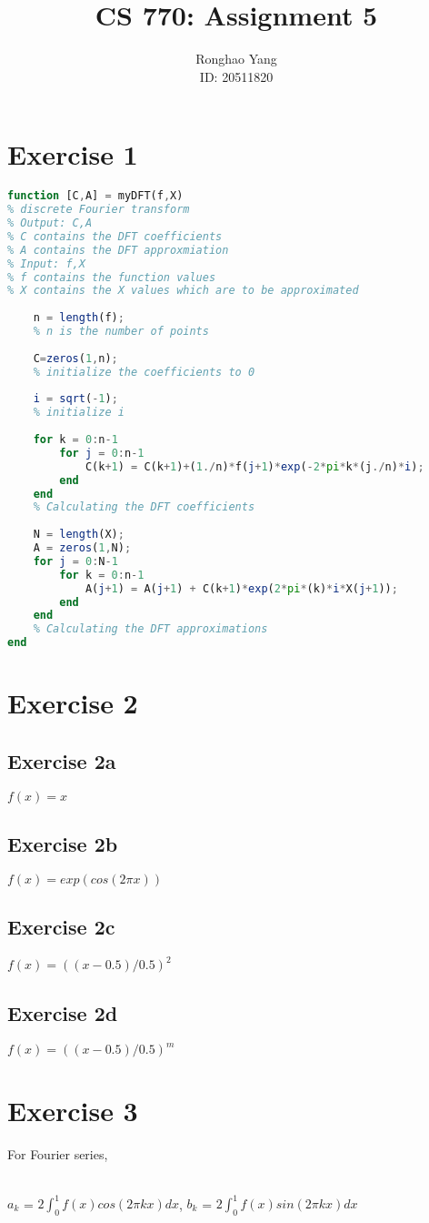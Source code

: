 \documentclass[11pt]{article} %
\title{CS 770: Assignment 5}
\author{Ronghao Yang\\ID: 20511820}
\begin{document}
\maketitle

\section{Exercise 1}
\begin{lstlisting}[language=Octave]
function [C,A] = myDFT(f,X)
% discrete Fourier transform
% Output: C,A
% C contains the DFT coefficients
% A contains the DFT approxmiation
% Input: f,X
% f contains the function values
% X contains the X values which are to be approximated
    
    n = length(f);
    % n is the number of points
    
    C=zeros(1,n);
    % initialize the coefficients to 0
    
    i = sqrt(-1);
    % initialize i
    
    for k = 0:n-1
        for j = 0:n-1
            C(k+1) = C(k+1)+(1./n)*f(j+1)*exp(-2*pi*k*(j./n)*i);
        end
    end
    % Calculating the DFT coefficients
    
    N = length(X);
    A = zeros(1,N);
    for j = 0:N-1
        for k = 0:n-1
            A(j+1) = A(j+1) + C(k+1)*exp(2*pi*(k)*i*X(j+1));            
        end
    end
    % Calculating the DFT approximations
end
\end{lstlisting}
\section{Exercise 2}
\subsection{Exercise 2a}
$f(x)=x$
\subsection{Exercise 2b}
$f(x)=exp(cos(2\pi x))$
\subsection{Exercise 2c}
$f(x)=((x-0.5)/0.5)^{2}$
\subsection{Exercise 2d}
$f(x)=((x-0.5)/0.5)^{m}$

\section{Exercise 3}
For Fourier series,\\\\
\centerline{$a_{k}$ = $2\int_{0}^{1}f(x)cos(2\pi k x)dx$, $b_{k}$ = $2\int_{0}^{1}f(x)sin(2\pi k x)dx$}
\end{document}
